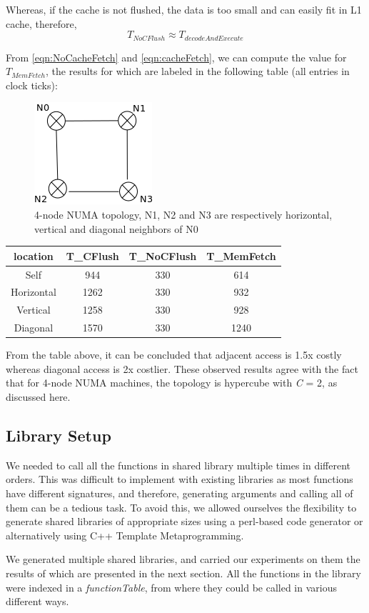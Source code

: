 Whereas, if the cache is not flushed, the data is too small and can easily fit in L1 cache, therefore, 
\begin{dmath}
\label{eqn:cacheFetch}
T_{NoCFlush} \approx T_{decodeAndExecute}
\end{dmath}

From \ref{eqn:NoCacheFetch} and \ref{eqn:cacheFetch}, we can compute the value for $T_{MemFetch}$, the
results for which are labeled in the following table (all entries in clock ticks):

\begin{figure}
    \centering
    \includegraphics[scale=0.38]{hypercube.png}
    \caption{4-node NUMA topology, N1, N2 and N3 are respectively horizontal, vertical and diagonal neighbors of N0}
    \label{fig:remoteVsLocal}
\end{figure}


\begin{center}
\begin{tabular}{c|c|c|c}
\hline
location & T_{CFlush} & T_{NoCFlush} & T_{MemFetch}\\
\hline
Self & 944 & 330 & 614\\
Horizontal & 1262 & 330 & 932 \\
Vertical & 1258 & 330 & 928\\
Diagonal & 1570 & 330 & 1240\\
\hline
\end{tabular}
\end{center}

From the table above, it can be concluded that adjacent access is 1.5x costly whereas diagonal access is
2x costlier. These observed results agree with the fact that for 4-node NUMA machines, the topology is
hypercube with \textit{C} = 2, as discussed here\cite{Drepper07whatevery}.

\subsection{Library Setup}
We needed to call all the functions in shared library multiple times in different orders. This was difficult
to implement with existing libraries as most functions have different signatures, and therefore, generating
arguments and calling all of them can be a tedious task. To avoid this, we allowed ourselves the flexibility
to generate shared libraries of appropriate sizes using a perl-based code generator or alternatively using
C++ Template Metaprogramming.\cite{templateMeta}

We generated multiple shared libraries, and carried our experiments on them the results of which are presented
in the next section. All the functions in the library were indexed in a \textit{functionTable}, from where they
could be called in various different ways.
